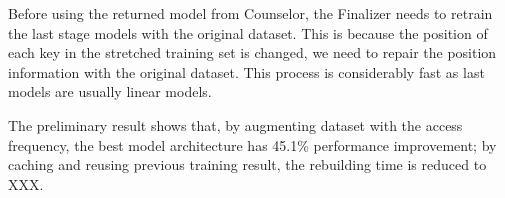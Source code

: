 \begin{bigabstract}
Before using the returned model from Counselor, the Finalizer needs to retrain the last stage models with the original dataset.
This is because the position of each key in the stretched training set is changed, we need to repair the position information with the original dataset.
This process is considerably fast as last models are usually linear models.

The preliminary result shows that, by augmenting dataset with the access frequency, the best model architecture has 45.1\% performance improvement; by caching and reusing previous training result, the rebuilding time is reduced to XXX.

\end{bigabstract}